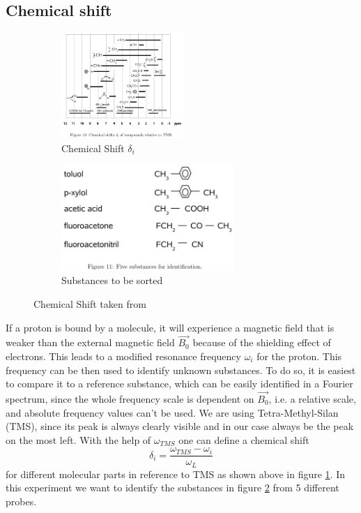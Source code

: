 \subsection{Chemical shift}\label{chemShift}
\begin{figure}[h]
	\begin{subfigure}{0.5\textwidth}
	\centering
	\includegraphics[width=0.7\linewidth ,height=4cm]{images/ChemShift.png}
	\caption{Chemical Shift $\delta_i$}
	\label{shi1}
	\end{subfigure}
	\begin{subfigure}{0.5\textwidth}
	\includegraphics[width=0.7\linewidth ,height=4cm]{images/substances.png}
	\caption{Substances to be sorted}
	\label{shi2}
	\end{subfigure}
	\caption{Chemical Shift taken from \cite{manual}}
	\label{shi3}
\end{figure}
If a proton is bound by a molecule, it will experience a magnetic field that is weaker than the external magnetic field $\vec{B_0}$ because of the shielding effect of electrons. This leads to a modified resonance frequency $\omega_i$ for the proton. This frequency can be then used to identify unknown substances. To do so, it is easiest to compare it to a reference substance, which can be easily identified in a Fourier spectrum, since the whole frequency scale is dependent on $\vec{B_0}$, i.e. a relative scale, and absolute frequency values can't be used. We are using Tetra-Methyl-Silan (TMS), since its peak is always clearly visible and in our case always be the peak on the most left. With the help of $\omega_{TMS}$ one can define a chemical shift
\begin{equation}\label{deltashift}
	\delta_i = \frac{\omega_{TMS}-\omega_{i}}{\omega_{L}}
\end{equation} 
for different molecular parts in reference to TMS as shown above in figure \ref{shi1}. In this experiment we want to identify the substances in figure \ref{shi2} from 5 different probes. \\
